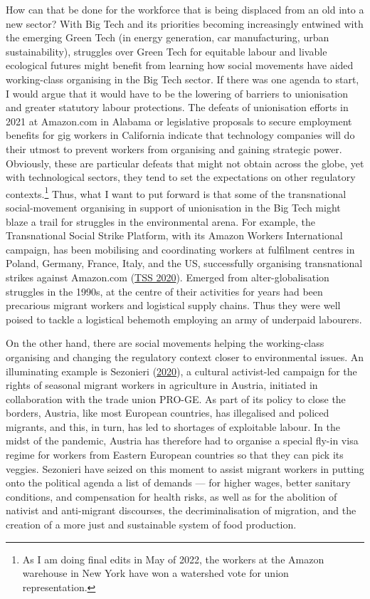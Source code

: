\documentclass[a4paper, nobind]{templates/ociamthesis}
\begin{document}
How can that be done for the workforce that is being displaced from an old into a new sector? With Big Tech and its priorities becoming increasingly entwined with the emerging Green Tech (in energy generation, car manufacturing, urban sustainability), struggles over Green Tech for equitable labour and livable ecological futures might benefit from learning how social movements have aided working-class organising in the Big Tech sector. If there was one agenda to start, I would argue that it would have to be the lowering of barriers to unionisation and greater statutory labour protections. The defeats of unionisation efforts in 2021 at Amazon.com in Alabama or legislative proposals to secure employment benefits for gig workers in California indicate that technology companies will do their utmost to prevent workers from organising and gaining strategic power. Obviously, these are particular defeats that might not obtain across the globe, yet with technological sectors, they tend to set the expectations on other regulatory contexts.\footnote{As I am doing final edits in May of 2022, the workers at the Amazon warehouse in New York have won a watershed vote for union representation.} Thus, what I want to put forward is that some of the transnational social-movement organising in support of unionisation in the Big Tech might blaze a trail for struggles in the environmental arena. For example, the Transnational Social Strike Platform, with its Amazon Workers International campaign, has been mobilising and coordinating workers at fulfilment centres in Poland, Germany, France, Italy, and the US, successfully organising transnational strikes against Amazon.com (\protect\hyperlink{ref-tss_transnational_2020}{TSS 2020}). Emerged from alter-globalisation struggles in the 1990s, at the centre of their activities for years had been precarious migrant workers and logistical supply chains. Thus they were well poised to tackle a logistical behemoth employing an army of underpaid labourers.

On the other hand, there are social movements helping the working-class organising and changing the regulatory context closer to environmental issues. An illuminating example is Sezonieri (\protect\hyperlink{ref-sezonieri_campaign_2020}{2020}), a cultural activist-led campaign for the rights of seasonal migrant workers in agriculture in Austria, initiated in collaboration with the trade union PRO-GE. As part of its policy to close the borders, Austria, like most European countries, has illegalised and policed migrants, and this, in turn, has led to shortages of exploitable labour. In the midst of the pandemic, Austria has therefore had to organise a special fly-in visa regime for workers from Eastern European countries so that they can pick its veggies. Sezonieri have seized on this moment to assist migrant workers in putting onto the political agenda a list of demands --- for higher wages, better sanitary conditions, and compensation for health risks, as well as for the abolition of nativist and anti-migrant discourses, the decriminalisation of migration, and the creation of a more just and sustainable system of food production.
\end{document}
